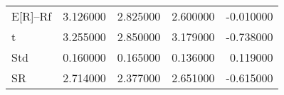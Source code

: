 \begin{tabular}{lrrrr}
\toprule
\midrule
E[R]--Rf & 3.126000 & 2.825000 & 2.600000 & -0.010000 \\
t & 3.255000 & 2.850000 & 3.179000 & -0.738000 \\
Std & 0.160000 & 0.165000 & 0.136000 & 0.119000 \\
SR & 2.714000 & 2.377000 & 2.651000 & -0.615000 \\
\bottomrule
\end{tabular}
